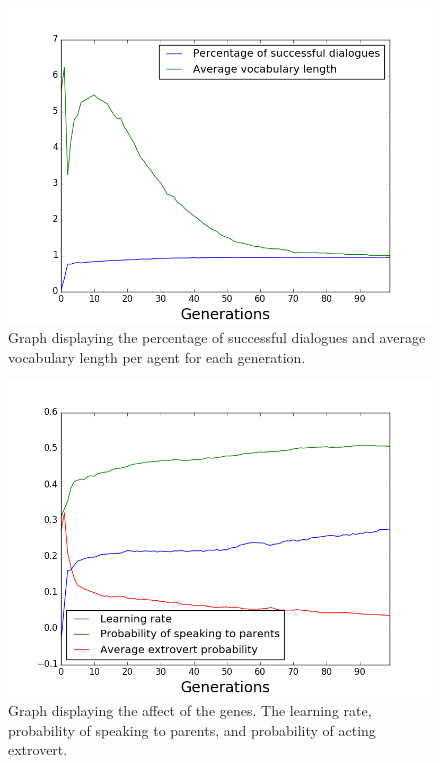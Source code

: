 \begin{figure}[htbp]
    \centering
    \includegraphics[scale=0.5]{fig/Results/Exp4/Vocabulary1}
    \caption{Graph displaying the percentage of successful dialogues and average vocabulary length per agent for each generation.}
    \label{fig:Vocabulary4}
\end{figure}
\begin{figure}[htbp]
    \centering
    \includegraphics[scale=0.5]{fig/Results/Exp4/genes1}
    \caption{Graph displaying the affect of the genes. The learning rate, probability of speaking to parents, and probability of acting extrovert.}
    \label{fig:Genes4}
\end{figure}

